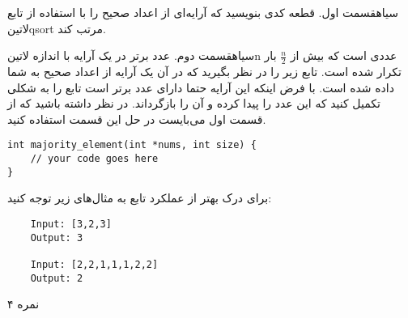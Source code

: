 
‌سیاه{قسمت اول.}
قطعه کدی بنویسید که آرایه‌ای از اعداد صحیح را با استفاده از تابع
‌لاتین{qsort}
مرتب کند.

‌سیاه{قسمت دوم.}
عدد برتر در یک آرایه با اندازه ‌لاتین{n}
عددی است که بیش از
$\frac{n}{2}$
بار تکرار شده است.
تابع زیر را در نظر بگیرید که در آن یک آرایه از اعداد صحیح به شما داده شده است. با فرض اینکه این آرایه حتما دارای عدد برتر است تابع را به شکلی تکمیل کنید که
این عدد را پیدا کرده و آن را بازگرداند.
در نظر داشته باشید که از قسمت اول می‌بایست در حل این قسمت استفاده کنید.

\begin{latin}
\begin{verbatim}
int majority_element(int *nums, int size) {
    // your code goes here
}
\end{verbatim}
\end{latin}

برای درک بهتر از عملکرد تابع به مثال‌های زیر توجه کنید:

\begin{latin}
\begin{verbatim}
    Input: [3,2,3]
    Output: 3

    Input: [2,2,1,1,1,2,2]
    Output: 2
\end{verbatim}
\end{latin}

۴ نمره
